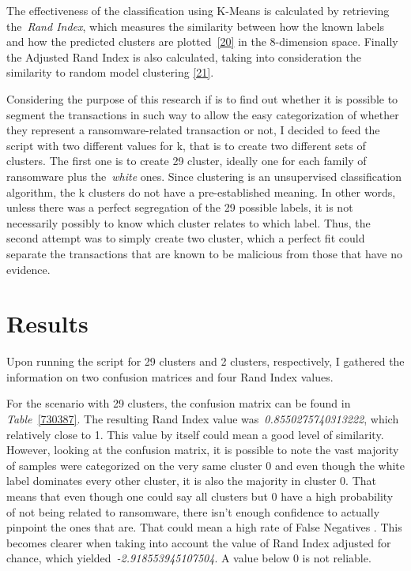 \documentclass[10pt]{article}
\begin{document}
{\label{153660}}

The effectiveness of the classification using K-Means is calculated by
retrieving the~\emph{Rand Index}, which measures the similarity between
how the known labels and how the predicted clusters are
plotted~\hyperref[csl:20]{[20]} in the 8-dimension space. Finally the
Adjusted Rand Index is also calculated, taking into consideration the
similarity to random model clustering \hyperref[csl:21]{[21]}.

Considering the purpose of this research if is to find out whether it is
possible to segment the transactions in such way to allow the easy
categorization of whether they represent a ransomware-related
transaction or not, I decided to feed the script with two different
values for k, that is to create two different sets of clusters. The
first one is to create 29 cluster, ideally one for each family of
ransomware plus the~\emph{white} ones. Since clustering is an
unsupervised classification algorithm, the k clusters do not have a
pre-established meaning. In other words, unless there was a perfect
segregation of the 29 possible labels, it is not necessarily possibly to
know which cluster relates to which label. Thus, the second attempt was
to simply create two cluster, which a perfect fit could separate the
transactions that are known to be malicious from those that have no
evidence.

\section*{Results}

{\label{481498}}

Upon running the script for 29 clusters and 2 clusters, respectively, I
gathered the information on two confusion matrices and four Rand Index
values.

For the scenario with 29 clusters, the confusion matrix can be found in
\emph{Table~}{\ref{730387}}. The resulting Rand Index
value was~\emph{0.8550275740313222}, which relatively close to 1. This
value by itself could mean a good level of similarity. However, looking
at the confusion matrix, it is possible to note the vast majority of
samples were categorized on the very same cluster 0 and even though the
white label dominates every other cluster, it is also the majority in
cluster 0. That means that even though one could say all clusters but 0
have a high probability of not being related to ransomware, there isn't
enough confidence to actually pinpoint the ones that are. That could
mean a high rate of False Negatives . This becomes clearer when taking
into account the value of Rand Index adjusted for chance, which
yielded~\emph{-2.918553945107504}. A value below 0 is not reliable.
\end{document}
